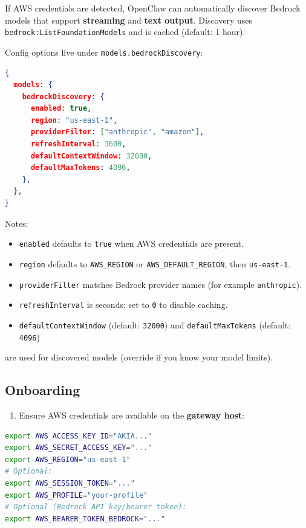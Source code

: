 If AWS credentials are detected, OpenClaw can automatically discover Bedrock
models that support \textbf{streaming} and \textbf{text output}. Discovery uses
\texttt{bedrock:ListFoundationModels} and is cached (default: 1 hour).

Config options live under \texttt{models.bedrockDiscovery}:

\begin{lstlisting}[language=json]
{
  models: {
    bedrockDiscovery: {
      enabled: true,
      region: "us-east-1",
      providerFilter: ["anthropic", "amazon"],
      refreshInterval: 3600,
      defaultContextWindow: 32000,
      defaultMaxTokens: 4096,
    },
  },
}
\end{lstlisting}


Notes:

\begin{itemize}
  \item \texttt{enabled} defaults to \texttt{true} when AWS credentials are present.
  \item \texttt{region} defaults to \texttt{AWS\_REGION} or \texttt{AWS\_DEFAULT\_REGION}, then \texttt{us-east-1}.
  \item \texttt{providerFilter} matches Bedrock provider names (for example \texttt{anthropic}).
  \item \texttt{refreshInterval} is seconds; set to \texttt{0} to disable caching.
  \item \texttt{defaultContextWindow} (default: \texttt{32000}) and \texttt{defaultMaxTokens} (default: \texttt{4096})
\end{itemize}

are used for discovered models (override if you know your model limits).

\subsection{Onboarding}


\begin{enumerate}
  \item Ensure AWS credentials are available on the \textbf{gateway host}:
\end{enumerate}


\begin{lstlisting}[language=bash]
export AWS_ACCESS_KEY_ID="AKIA..."
export AWS_SECRET_ACCESS_KEY="..."
export AWS_REGION="us-east-1"
# Optional:
export AWS_SESSION_TOKEN="..."
export AWS_PROFILE="your-profile"
# Optional (Bedrock API key/bearer token):
export AWS_BEARER_TOKEN_BEDROCK="..."
\end{lstlisting}


